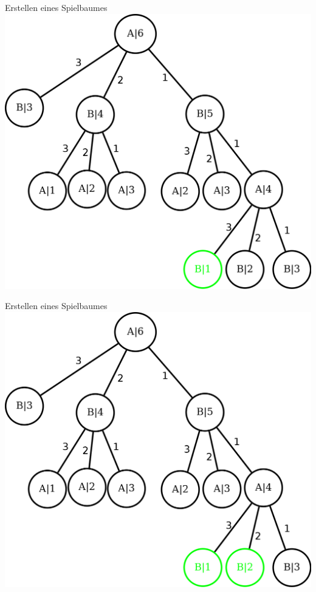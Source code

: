 \documentclass[18pt]{beamer}
\begin{document}
\begin{frame}{Erstellen eines Spielbaumes}
\includegraphics[scale=0.55]{baum1.png}
\end{frame}

\begin{frame}{Erstellen eines Spielbaumes}
\includegraphics[scale=0.55]{baum2.png}
\end{frame}
\end{document}
